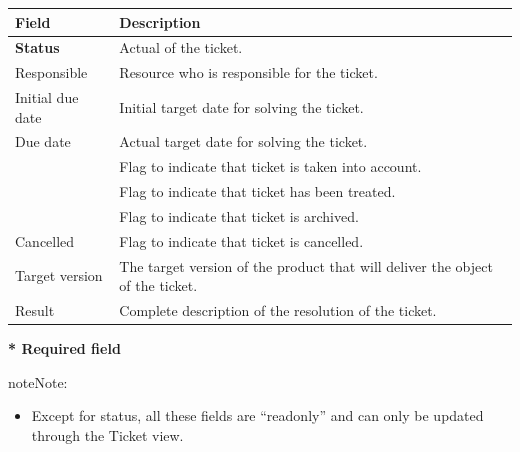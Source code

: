 \documentclass[letterpaper,10pt,english]{sphinxmanual}
\begin{document}
\begin{tabulary}{\linewidth}{|l|l|}
\hline
\textsf{\relax 
Field
} & \textsf{\relax 
Description
}\\
\hline
\textbf{Status}
 & 
Actual {\hyperref[Glossary:term-status]{\emph{}}} of the ticket.
\\
\hline
Responsible
 & 
Resource who is responsible for the ticket.
\\
\hline
Initial due date
 & 
Initial target date for solving the ticket.
\\
\hline
Due date
 & 
Actual target date for solving the ticket.
\\
\hline
{\hyperref[Glossary:term-handled]{\emph{}}}
 & 
Flag to indicate that ticket is taken into account.
\\
\hline
{\hyperref[Glossary:term-done]{\emph{}}}
 & 
Flag to indicate that ticket has been treated.
\\
\hline
{\hyperref[Glossary:term-closed]{\emph{}}}
 & 
Flag to indicate that ticket is archived.
\\
\hline
Cancelled
 & 
Flag to indicate that ticket is cancelled.
\\
\hline
Target version
 & 
The target version of the product that will deliver the object of the ticket.
\\
\hline
Result
 & 
Complete description of the resolution of the ticket.
\\
\hline\end{tabulary}


\textbf{* Required field}

\begin{notice}{note}{Note:}\begin{itemize}
\item {} 
Except for status, all these fields are “readonly” and can only be updated through the Ticket view.

\end{itemize}
\end{notice}
\end{document}

